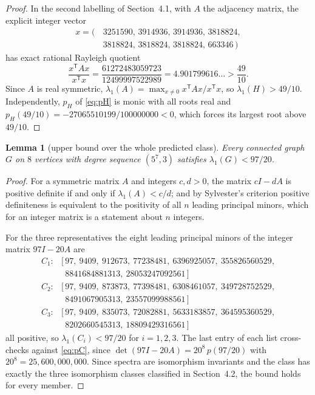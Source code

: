 \documentclass[11pt]{amsart}
\newtheorem{lemma}[theorem]{Lemma}
\theoremstyle{definition}
\begin{document}
\begin{proof}
In the second labelling of Section~4.1, with $A$ the adjacency matrix, the explicit
integer vector
\[
\begin{aligned}
x=(\,&3251590,\,3914936,\,3914936,\,3818824,\\
    &3818824,\,3818824,\,3818824,\,663346\,)
\end{aligned}
\]
has exact rational Rayleigh quotient
\[
\frac{x^{\mathsf T}Ax}{x^{\mathsf T}x}
=\frac{61272483059723}{12499997522989}=4.901799616\ldots>\frac{49}{10}.
\]
Since $A$ is real symmetric, $\lambda_1(A)=\max_{x\ne 0}x^{\mathsf T}Ax/x^{\mathsf T}x$,
so $\lambda_1(H)>49/10$. Independently, $p_H$ of \eqref{eq:pH} is monic with all
roots real and $p_H(49/10)=-27065510199/100000000<0$, which forces its largest
root above $49/10$.
\end{proof}

\begin{lemma}[upper bound over the whole predicted class]\label{lem:upper}
Every connected graph $G$ on $8$ vertices with degree sequence $(5^7,3)$
satisfies $\lambda_1(G)<97/20$.
\end{lemma}

\begin{proof}
For a symmetric matrix $A$ and integers $c,d>0$, the matrix $cI-dA$ is positive
definite if and only if $\lambda_1(A)<c/d$; and by Sylvester's criterion
positive definiteness is equivalent to the positivity of all $n$ leading
principal minors, which for an integer matrix is a statement about $n$ integers.

For the three representatives the eight leading principal minors of the integer
matrix $97I-20A$ are
\[
\begin{array}{ll}
C_1:&[\,97,\ 9409,\ 912673,\ 77238481,\ 6396925057,\ 355826560529,\\
    &\ \ 8841684881313,\ 28053247092561\,]\\[2pt]
C_2:&[\,97,\ 9409,\ 873873,\ 77398481,\ 6308461057,\ 349728752529,\\
    &\ \ 8491067905313,\ 23557099988561\,]\\[2pt]
C_3:&[\,97,\ 9409,\ 835073,\ 72082881,\ 5633183857,\ 364595360529,\\
    &\ \ 8202660545313,\ 18809429316561\,]
\end{array}
\]
all positive, so $\lambda_1(C_i)<97/20$ for $i=1,2,3$. The last entry of each
list cross-checks against \eqref{eq:pC}, since
$\det(97I-20A)=20^8\,p(97/20)$ with $20^8=25{,}600{,}000{,}000$. Since spectra
are isomorphism invariants and the class has
exactly the three isomorphism classes classified in Section~4.2, the bound holds
for every member.
\end{proof}
\end{document}
